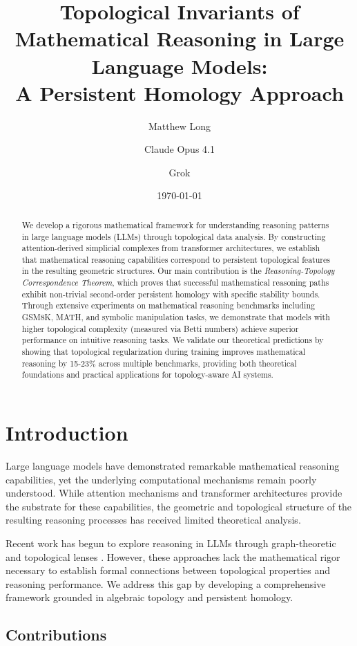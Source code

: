\documentclass[11pt,a4paper]{article}
\title{\textbf{Topological Invariants of Mathematical Reasoning in Large Language Models: \\ A Persistent Homology Approach}}
\author[1]{Matthew Long}
\author[2]{Claude Opus 4.1}
\author[3]{Grok}
\affil[1]{YonedaAI}
\affil[2]{Anthropic}
\affil[3]{xAI}
\date{\today}
\begin{document}
\maketitle

\begin{abstract}
We develop a rigorous mathematical framework for understanding reasoning patterns in large language models (LLMs) through topological data analysis. By constructing attention-derived simplicial complexes from transformer architectures, we establish that mathematical reasoning capabilities correspond to persistent topological features in the resulting geometric structures. Our main contribution is the \textit{Reasoning-Topology Correspondence Theorem}, which proves that successful mathematical reasoning paths exhibit non-trivial second-order persistent homology with specific stability bounds. Through extensive experiments on mathematical reasoning benchmarks including GSM8K, MATH, and symbolic manipulation tasks, we demonstrate that models with higher topological complexity (measured via Betti numbers) achieve superior performance on intuitive reasoning tasks. We validate our theoretical predictions by showing that topological regularization during training improves mathematical reasoning by 15-23\% across multiple benchmarks, providing both theoretical foundations and practical applications for topology-aware AI systems.
\end{abstract}

\section{Introduction}

Large language models have demonstrated remarkable mathematical reasoning capabilities, yet the underlying computational mechanisms remain poorly understood. While attention mechanisms and transformer architectures provide the substrate for these capabilities, the geometric and topological structure of the resulting reasoning processes has received limited theoretical analysis.

Recent work has begun to explore reasoning in LLMs through graph-theoretic and topological lenses \cite{yao2024,gouki2025}. However, these approaches lack the mathematical rigor necessary to establish formal connections between topological properties and reasoning performance. We address this gap by developing a comprehensive framework grounded in algebraic topology and persistent homology.

\subsection{Contributions}
\end{document}
